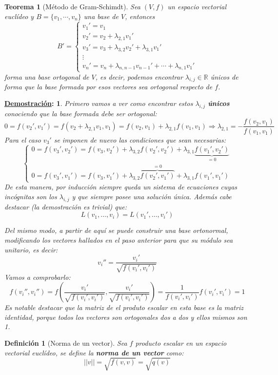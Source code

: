 \documentclass[10pt,a4paper,openright]{book}
\theoremstyle{break}
\newtheorem*{defi}{Definición}
\newtheorem*{theo}{Teorema}
\newtheorem*{demo}{\underline{Demostración}:}
\begin{document}
\begin{theo}[Método de Gram-Schimdt]
Sea $(V,f)$ un espacio vectorial euclídeo y $B=\{v_1, \cdots, v_n\}$ una base de $V$, entonces
$$B'= \begin{cases} v_1' = v_1  \\ v_2' = v_2 + \lambda_{2,1}v_1' \\ v_3' = v_3 + \lambda_{3,2}v_2' + \lambda_{3,1}v_1' \\ \vdots \\ v_n' = v_n + \lambda_{n,n-1}v_{n-1}'+\cdots + \lambda_{n,1}v_1'\end{cases}$$
forma una base ortogonal de $V$, es decir, podemos encontrar $\lambda_{i,j}\in \mathbb R$ únicos de forma que la base formada por esos vectores sea ortogonal respecto de $f$.
\end{theo}
\begin{demo}
Primero vamos a ver como encontrar estos $\lambda_{i,j}$ \textbf{únicos} conociendo que la base formada debe ser ortogonal:
$$0 = f(v_2',v_1') = f(v_2+\lambda_{2,1}v_1, v_1) = f(v_2,v_1)+\lambda_{2,1}f(v_1,v_1)\Rightarrow \lambda_{2,1} = -\frac{f(v_2,v_1)}{f(v_1,v_1)}$$
Para el caso $v_3'$ se imponen de nuevo las condiciones que sean necesarias:
$$\begin{cases} 0=f(v_3',v_2') = f(v_3,v_2')+\lambda_{3,2}f(v_2',v_2')+\lambda_{3,1}\underbrace{f(v_1',v_2')}_{=0} \\ 0 = f(v_3', v_1') = f(v_3, v_1')+ \lambda_{3,2}\overbrace{f(v_2',v_1')}^{=0}+\lambda_{3,1}f(v_1',v_1') \end{cases}$$
De esta manera, por inducción siempre queda un sistema de ecuaciones cuyas incógnitas son los $\lambda_{i,j}$ y que siempre posee una solución única. Además cabe destacar (la demostración es trivial) que:
$$L(v_1, \ldots, v_i) = L(v_1', \ldots, v_i')$$

Del mismo modo, a partir de aquí se puede construir una base ortonormal, modificando los vectores hallados en el paso anterior para que su módulo sea unitario, es decir:
$$v_i''= \frac{v_i'}{\sqrt{f(v_i',v_i')}}$$
Vamos a comprobarlo:
$$f(v_i'', v_i'')=f\left(\frac{v_i'}{\sqrt{f(v_i',v_i')}},\frac{v_i'}{\sqrt{f(v_i',v_i')}}\right) = \frac{1}{f(v_i',v_i')}f(v_i',v_i') = 1$$
Es notable destacar que la matriz de el produto escalar en esta base es la matriz identidad, porque todos los vectores son ortogonales dos a dos y ellos mismos son 1.
\end{demo}

\begin{defi}[Norma de un vector]
Sea $f$ producto escalar en un espacio vectorial euclídeo, se define la \textbf{norma de un vector} como:
$$||v|| = \sqrt{f(v,v)} =\sqrt{q(v)}$$
\end{defi}
\end{document}

